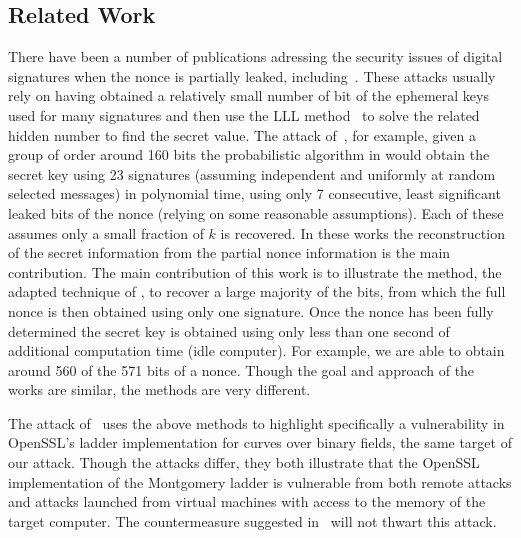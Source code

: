 \documentclass{llncs}
\begin{document}
\subsection{Related Work}\label{sec:related}
There have been a number of publications adressing the security issues of digital signatures when the nonce is partially leaked, including~\cite{Howgrave-GrahamS01,gopalakrishnan07solving,nguyen03insecurity}. These attacks usually rely on having obtained a relatively small number of bit of the ephemeral keys used for many signatures and then use the LLL method~\cite{LLL} to solve the related hidden number to find the secret value. The attack of~\cite{nguyen03insecurity}, for example, given a group of order around 160 bits the probabilistic algorithm in would obtain the secret key using 23 signatures (assuming independent and uniformly at random selected messages) in polynomial time, using only 7 consecutive, least significant leaked bits of the nonce (relying on some reasonable assumptions). Each of these assumes only a small fraction of $k$ is recovered. In these works the reconstruction of the secret information from the partial nonce information is the main contribution. The main contribution of this work is to illustrate the method, the adapted technique of \cite{yarom13flush}, to recover a large majority of the bits, from which the full nonce is then obtained using only one signature. Once the nonce has been fully determined the secret key is obtained using only less than one second of additional computation time (idle computer). 
For example, we are able to obtain around 560 of the 571 bits of a nonce. Though the goal and approach of the works are similar, the methods are very different.

The attack of~\cite{brumley11remote} uses the above methods to highlight specifically a vulnerability in OpenSSL's ladder implementation for curves over binary fields, the same target of our attack. Though the attacks differ, they both illustrate that the OpenSSL implementation of the Montgomery ladder is vulnerable from both remote attacks and attacks launched from virtual machines with access to the memory of the target computer. The countermeasure suggested in~\cite{brumley11remote} will not thwart this attack.

\end{document}
